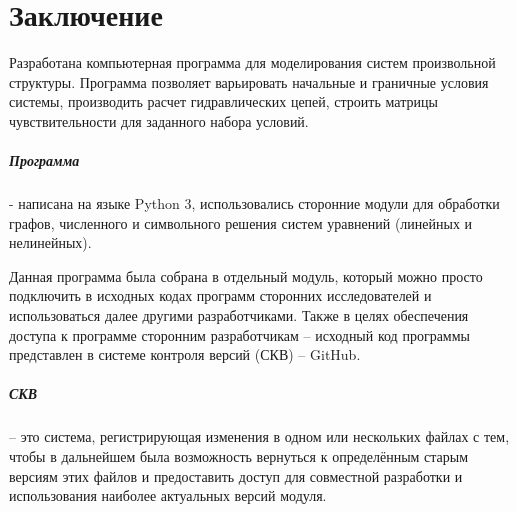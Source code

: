 \chapter{Заключение}
Разработана компьютерная программа для моделирования
систем произвольной структуры. Программа позволяет варьировать начальные и граничные условия системы, производить расчет гидравлических цепей, строить матрицы чувствительности для заданного набора условий.

\paragraph{Программа} - написана на языке Python 3, использовались сторонние модули для обработки графов, численного и символьного решения систем уравнений (линейных и нелинейных). 

Данная программа была собрана в отдельный модуль, который можно просто подключить в исходных кодах программ сторонних исследователей и использоваться далее другими разработчиками. Также в целях обеспечения доступа к программе сторонним разработчикам -- исходный код программы представлен в системе контроля версий (СКВ) -- GitHub.

\paragraph{СКВ} -- это система, регистрирующая изменения в одном или нескольких файлах с тем, чтобы в дальнейшем была возможность вернуться к определённым старым версиям этих файлов и предоставить доступ для совместной разработки и использования наиболее актуальных версий модуля.